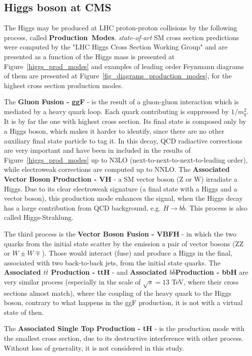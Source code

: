 \subsection{Higgs boson at CMS}
\label{section_sm_vb_results}

The Higgs may be produced at LHC proton-proton collisions by the following process, called \mbox{\textbf{Production Modes}}. \textit{state-of-art} SM cross section predictions were computed by the "LHC Higgs Cross Section Working Group"\cite{deFlorian:2016spz} and are presented as a function of the Higgs mass is presented at Figure~\ref{higgs_prod_modes} and examples of leading order Feynmann diagrams of them are presented at Figure~\ref{fig_diagrams_production_modes}, for the highest cross section production modes.

The \textbf{Gluon Fusion - ggF} - is the result of a gluon-gluon interaction which is mediated by a heavy quark loop. Each quark contributing is suppressed by $1/m_{q}^{2}$. It is by far the one with highest cross section. Its final state is composed only by a Higgs boson, which makes it harder to identify, since there are no other auxiliary final state particle to tag it. In this decay, QCD radiactive corrections are very important and have been in included in the results of Figure~\ref{higgs_prod_modes} up to N3LO (next-to-next-to-next-to-leading order), while electroweak corrections are computed up to NNLO. The \textbf{Associated Vector Boson Production - VH} - a SM vector boson (Z or W) irradiate a Higgs. Due to its clear electroweak signature (a final state with a Higgs and a vector boson), this production mode enhances the signal, when the Higgs decay has a large contribution from QCD background, e.g. $H \rightarrow b\bar{b}$. This process is also called Higgs-Strahlung.

The third process is the \textbf{Vector Boson Fusion - VBFH} - in which the two quarks from the initial state scatter by the emission a pair of vector bosons (ZZ or $W{\pm}W{\mp}$). Those would interact (fuse) and produce a Higgs in the final, associated with two back-to-back jets, from the initial state quarks. The \textbf{Associated $t\bar{t}$ Production - ttH} - and \textbf{Associated $b\bar{b}$Production - bbH} are very similar process (especially in the scale of $\sqrt{s} = 13$ TeV, where their cross sections almost match), where the coupling of the heavy quark to the Higgs boson, contrary to what happens in the ggF production, it is not with a virtual state of then. 

The \textbf{Associated Single Top Production - tH} - is the production mode with the smallest cross section, due to its destructive interference with other process. Without loss of generality, it is not considered in this study.


